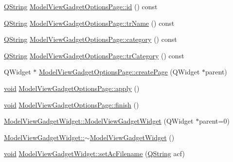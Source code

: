 \begin{DoxyCompactItemize}
\item 
\hyperlink{group___u_a_v_objects_plugin_gab9d252f49c333c94a72f97ce3105a32d}{\-Q\-String} \hyperlink{group___model_view_plugin_ga4ef97dfb27bc7bf0761a6ef8c9992461}{\-Model\-View\-Gadget\-Options\-Page\-::id} () const 
\item 
\hyperlink{group___u_a_v_objects_plugin_gab9d252f49c333c94a72f97ce3105a32d}{\-Q\-String} \hyperlink{group___model_view_plugin_ga957813f49ad4050f6d8fe39c8ddb8db9}{\-Model\-View\-Gadget\-Options\-Page\-::tr\-Name} () const 
\item 
\hyperlink{group___u_a_v_objects_plugin_gab9d252f49c333c94a72f97ce3105a32d}{\-Q\-String} \hyperlink{group___model_view_plugin_ga7ac23d7285b3e6b2541b45329d26d973}{\-Model\-View\-Gadget\-Options\-Page\-::category} () const 
\item 
\hyperlink{group___u_a_v_objects_plugin_gab9d252f49c333c94a72f97ce3105a32d}{\-Q\-String} \hyperlink{group___model_view_plugin_ga0026a37d0b02b743a513a6f79b88928e}{\-Model\-View\-Gadget\-Options\-Page\-::tr\-Category} () const 
\item 
\-Q\-Widget $\ast$ \hyperlink{group___model_view_plugin_ga5a42eda3ce28f2971be7b426347d588a}{\-Model\-View\-Gadget\-Options\-Page\-::create\-Page} (\-Q\-Widget $\ast$parent)
\item 
\hyperlink{group___u_a_v_objects_plugin_ga444cf2ff3f0ecbe028adce838d373f5c}{void} \hyperlink{group___model_view_plugin_ga77c3c23e38d3018c84f464c0ef5402e5}{\-Model\-View\-Gadget\-Options\-Page\-::apply} ()
\item 
\hyperlink{group___u_a_v_objects_plugin_ga444cf2ff3f0ecbe028adce838d373f5c}{void} \hyperlink{group___model_view_plugin_ga9ba47bc802df977b1f8cc5f1c8b70ca3}{\-Model\-View\-Gadget\-Options\-Page\-::finish} ()
\item 
\hyperlink{group___model_view_plugin_ga7b299b7e0c58f0bca02228b6376370a6}{\-Model\-View\-Gadget\-Widget\-::\-Model\-View\-Gadget\-Widget} (\-Q\-Widget $\ast$parent=0)
\item 
\hyperlink{group___model_view_plugin_gafd8359344ca9b61a21a93e1256e9247a}{\-Model\-View\-Gadget\-Widget\-::$\sim$\-Model\-View\-Gadget\-Widget} ()
\item 
\hyperlink{group___u_a_v_objects_plugin_ga444cf2ff3f0ecbe028adce838d373f5c}{void} \hyperlink{group___model_view_plugin_ga61a44ab1922172cfaee66b78fde29538}{\-Model\-View\-Gadget\-Widget\-::set\-Ac\-Filename} (\hyperlink{group___u_a_v_objects_plugin_gab9d252f49c333c94a72f97ce3105a32d}{\-Q\-String} acf)
\item 

\end{DoxyCompactItemize}
